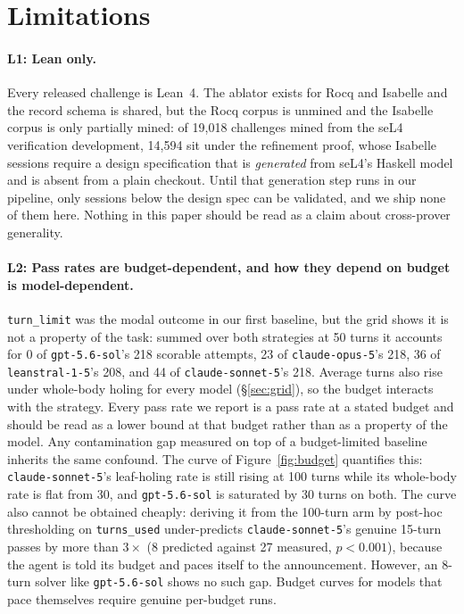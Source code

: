 \documentclass{article}
\begin{document}
\section{Limitations}
\label{sec:limitations}

\paragraph{L1: Lean only.} Every released challenge is Lean~4. The ablator exists for Rocq and
Isabelle and the record schema is shared, but the Rocq corpus is unmined and the Isabelle corpus
is only partially mined: of 19{,}018 challenges mined from the seL4 verification development,
14{,}594 sit under the refinement proof, whose Isabelle sessions require a design specification
that is \emph{generated} from seL4’s Haskell model and is absent from a plain checkout. Until that
generation step runs in our pipeline, only sessions below the design spec can be validated, and we
ship none of them here. Nothing in this paper should be read as a claim about cross-prover
generality.

\paragraph{L2: Pass rates are budget-dependent, and how they depend on budget is
model-dependent.} \texttt{turn\_limit} was the modal outcome in our first baseline, but the grid
shows it is not a property of the task: summed over both strategies at 50 turns it accounts for 0
of \texttt{gpt-5.6-sol}'s 218 scorable attempts, 23 of \texttt{claude-opus-5}'s 218, 36 of
\texttt{leanstral-1-5}'s 208, and 44 of \texttt{claude-sonnet-5}'s 218. Average turns also rise under whole-body holing for every model
(\S\ref{sec:grid}), so the budget interacts with the strategy. Every pass rate we report is a
pass rate at a stated budget and should be read as a lower bound at that budget rather than as a
property of the model. Any contamination gap measured on top of a budget-limited baseline
inherits the same confound. The curve of Figure~\ref{fig:budget} quantifies this:
\texttt{claude-sonnet-5}’s leaf-holing rate is still rising at 100 turns while its whole-body rate is flat from 30, and
\texttt{gpt-5.6-sol} is saturated by 30 turns on both. The curve also cannot be obtained
cheaply: deriving it from the 100-turn arm by post-hoc thresholding on \texttt{turns\_used}
under-predicts \texttt{claude-sonnet-5}'s genuine 15-turn passes by more than $3\times$ (8
predicted against 27 measured, $p<0.001$), because the agent is told its budget and paces itself to the announcement.
However, an 8-turn solver like \texttt{gpt-5.6-sol} shows no such gap. Budget curves for models that
pace themselves require genuine per-budget runs.
\end{document}
